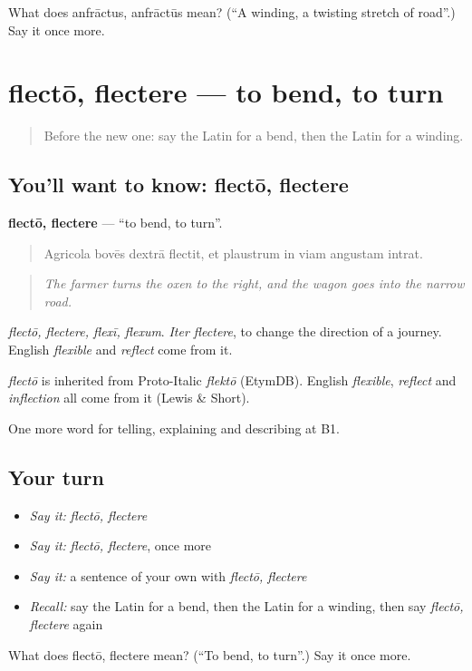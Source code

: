 \begin{tcolorbox}[breakable,colback=teal!4,colframe=teal!35!black,title={Before you move on}]
What does anfrāctus, anfrāctūs mean? (\textquotedblleft{}A winding, a twisting stretch of road\textquotedblright{}.) Say it once more.
\end{tcolorbox}
\section[flectō, flectere]{flectō, flectere — to bend, to turn}

\label{lesson:LA-C424-flecto}



\begin{quote}
Before the new one: say the Latin for a bend, then the Latin for a winding.
\end{quote}

\subsection*{You'll want to know: flectō, flectere}
\textbf{flectō, flectere} — \textquotedblleft{}to bend, to turn\textquotedblright{}.

\begin{quote}
Agricola bovēs dextrā flectit, et plaustrum in viam angustam intrat.
\end{quote}

\begin{quote}
\emph{The farmer turns the oxen to the right, and the wagon goes into the narrow road.}
\end{quote}

\emph{flectō, flectere, flexī, flexum}. \emph{Iter flectere}, to change the direction of a journey. English \emph{flexible} and \emph{reflect} come from it.

\begin{cousinweb}
\emph{flectō} is inherited from Proto-Italic \emph{flektō} (EtymDB). English \emph{flexible}, \emph{reflect} and \emph{inflection} all come from it (Lewis \& Short).
\end{cousinweb}

\begin{grammarlens}[title={What you've built}]
One more word for telling, explaining and describing at B1.
\end{grammarlens}

\subsection*{Your turn}
\begin{itemize}
\raggedright
  \item \emph{Say it:} \emph{flectō, flectere}
  \item \emph{Say it:} \emph{flectō, flectere}, once more
  \item \emph{Say it:} a sentence of your own with \emph{flectō, flectere}
  \item \emph{Recall:} say the Latin for a bend, then the Latin for a winding, then say \emph{flectō, flectere} again
\end{itemize}

\begin{tcolorbox}[breakable,colback=teal!4,colframe=teal!35!black,title={Before you move on}]
What does flectō, flectere mean? (\textquotedblleft{}To bend, to turn\textquotedblright{}.) Say it once more.
\end{tcolorbox}
